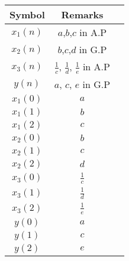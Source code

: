 \begin{tabular}{|c|c|c|}
    \hline
     \textbf{Symbol} & \textbf{Remarks} \\
    \hline
     $x_1(n)$ &  $a$,$b$,$c$ in A.P\\[6pt]
    \hline
     $x_2(n)$ &  $b$,$c$,$d$ in G.P\\[6pt]
    \hline
     $x_3(n)$ &  $\frac{1}{c}$, $\frac{1}{d}$, $\frac{1}{e}$ in A.P\\[6pt]
    \hline
     $y(n)$   &  $a$, $c$, $e$ in G.P\\[6pt]
    \hline
     $x_1(0)$ &  $a$\\[6pt]
    \hline
     $x_1(1)$ &  $b$\\[6pt]
    \hline
     $x_1(2)$ &  $c$\\[6pt]
    \hline
     $x_2(0)$ &  $b$\\[6pt]
    \hline
     $x_2(1)$ &  $c$\\[6pt]
    \hline
     $x_2(2)$ &  $d$\\[6pt]
    \hline
     $x_3(0)$ &  $\frac{1}{c}$\\[6pt]
    \hline
     $x_3(1)$ &  $\frac{1}{d}$\\[6pt]
    \hline
     $x_3(2)$ &  $\frac{1}{e}$\\[6pt]
    \hline
     $y(0)$   &  $a$\\[6pt]
    \hline
     $y(1)$   &  $c$\\[6pt]
    \hline
     $y(2)$   &  $e$\\[6pt]
    \hline
\end{tabular}

